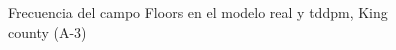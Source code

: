 \begin{figure}[H]
    \centering
    
    \caption{Frecuencia del campo Floors en el modelo real y tddpm, King county (A-3)}
    \label{frecuency-tddpm-floors}
\end{figure}